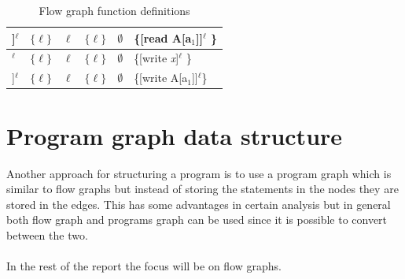 \begin{table}
\begin{tabular}{| l | l | l | l | l | l |}
\hline
[read A[a$_1$]]$^\ell$                & $\{\ell\}$                                            &$\ell$                & $\{\ell\}$  & $\emptyset$                                            &\{[read A[a$_1$]]$^\ell$ \}   \\
\hline
[write \textsl{x}]$^\ell$               & $\{\ell\}$                                            &$\ell$                & $\{\ell\}$  & $\emptyset$                                          &\{[write \textsl{x}]$^\ell$ \} \\
\hline
[write A[a$_1$]]$^\ell$               & $\{\ell\}$                                            &$\ell$                & $\{\ell\}$  & $\emptyset$                                          &\{[write A[a$_1$]]$^\ell$\} \\
\hline
\end{tabular}
\centering
\caption{Flow graph function definitions}
\label{table:flow_graph_functions}
\end{table}

\section{Program graph data structure}
Another approach for structuring a program is to use a program graph which is similar to flow graphs but instead of storing the statements in the nodes they are stored in the edges. This has some advantages in certain analysis but in general both flow graph and programs graph can be used since it is possible to convert between the two.
\\\\
In the rest of the report the focus will be on flow graphs.